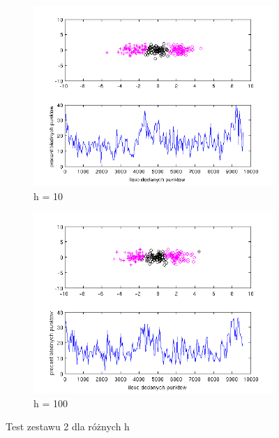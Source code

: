 \documentclass[10pt,a4paper]{article}
\begin{document}
\begin{figure}[H]
  \begin{subfigure}[b]{0.5\textwidth}
    \includegraphics[width=\textwidth]{test4_h10_16_60.png}
    \caption{h = 10}
  \end{subfigure}
  \hfill
  \begin{subfigure}[b]{0.5\textwidth}
    \includegraphics[width=\textwidth]{test4_h100_16_60.png}
    \caption{h = 100}
  \end{subfigure}
  
  
  \caption{Test zestawu 2 dla różnych h}
  \label{test_h4}
  
\end{figure}
\end{document}

